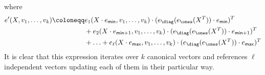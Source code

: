 where 
\begin{align}
e'(X,v_1,\ldots,v_k)\coloneqq &e_1(X\cdot e_{\mathsf{min}},v_1,\ldots,v_k)\cdot (e_{\diag}(e_{\ones}(X^T))\cdot e_{\mathsf{min}})^T \\
&+ e_2(X\cdot e_{\mathsf{min} + 1},v_1,\ldots,v_k)\cdot (e_{\diag}(e_{\ones}(X^T))\cdot e_{\mathsf{min} + 1})^T \\
&+ \ldots + e_\ell(X\cdot e_{\mathsf{max}},v_1,\ldots,v_k)\cdot (e_{\diag}(e_{\ones}(X^T))\cdot e_{\mathsf{max}})^T
\end{align}
It is clear that this expression iterates over $k$ canonical vectors and references $\ell$ independent vectors updating each of them in their particular way.
